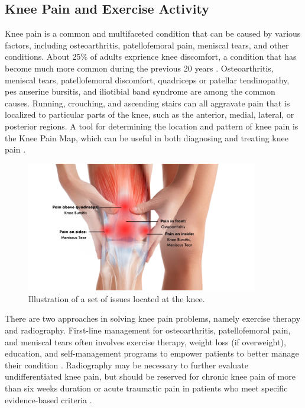 \subsection{Knee Pain and Exercise Activity}
\label{KneePain}
Knee pain is a common and multifaceted condition that can be caused by various factors, including osteoarthritis, patellofemoral pain, meniscal tears, and other conditions. About 25\% of adults exprience knee discomfort, a condition that has become much more common during the previous 20 years \cite{KneePain1}. Osteoarthritis, meniscal tears, patellofemoral discomfort, quadriceps or patellar tendinopathy, pes anserine bursitis, and iliotibial band syndrome are among the common causes. Running, crouching, and ascending stairs can all aggravate pain that is localized to particular parts of the knee, such as the anterior, medial, lateral, or posterior regions. A tool for determining the location and pattern of knee pain is the Knee Pain Map, which can be useful in both diagnosing and treating knee pain \cite{KneePain2, KneePain3}.

\begin{figure}[h!]
    \centering
    \includegraphics[width=0.9\textwidth]{bab2/ar_KneePain.png}
    \caption{Illustration of a set of issues located at the knee.}
    \label{fig:KneePain}
\end{figure}

There are two approaches in solving knee pain problems, namely exercise therapy and radiography. First-line management for osteoarthritis, patellofemoral pain, and meniscal tears often involves exercise therapy, weight loss (if overweight), education, and self-management programs to empower patients to better manage their condition \cite{KneePain4}. Radiography may be necessary to further evaluate undifferentiated knee pain, but should be reserved for chronic knee pain of more than six weeks duration or acute traumatic pain in patients who meet specific evidence-based criteria \cite{KneePain1}.

